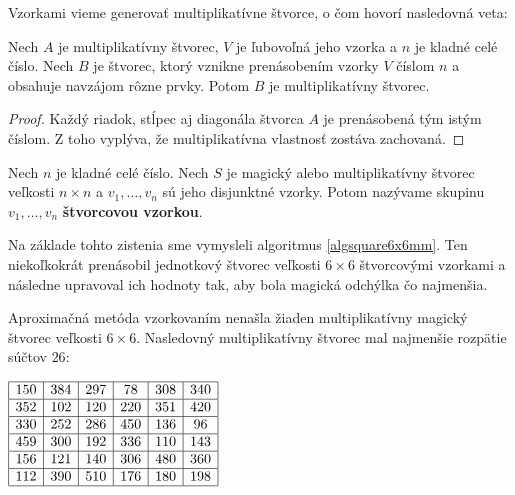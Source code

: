Vzorkami vieme generovať multiplikatívne štvorce, o čom hovorí nasledovná veta:

\begin{theorem}
\label{addmultsquarepattern}
Nech $A$ je multiplikatívny štvorec, $V$ je ľubovoľná jeho vzorka a $n$ je kladné celé číslo. Nech $B$ je štvorec, ktorý vznikne prenásobením vzorky $V$ číslom $n$ a obsahuje navzájom rôzne prvky. Potom $B$ je multiplikatívny štvorec.
\end{theorem}

\begin{proof} Každý riadok, stĺpec aj diagonála štvorca $A$ je prenásobená tým istým číslom. Z toho vyplýva, že multiplikatívna vlastnosť zostáva zachovaná.
\end{proof}

\begin{definition} Nech $n$ je kladné celé číslo. Nech $S$ je magický alebo multiplikatívny štvorec veľkosti $n \times n$ a $v_1, \dots , v_n$ sú jeho disjunktné vzorky. Potom nazývame skupinu $v_1, \dots , v_n$ \textbf{štvorcovou vzorkou}.
\end{definition}

Na základe tohto zistenia sme vymysleli algoritmus \ref{algsquare6x6mm}. Ten niekoľkokrát prenásobil jednotkový štvorec veľkosti $6 \times 6$ štvorcovými vzorkami a následne upravoval ich hodnoty tak, aby bola magická odchýlka čo najmenšia.

\begin{result} Aproximačná metóda vzorkovaním nenašla žiaden multiplikatívny magický štvorec veľkosti $6 \times 6$. Nasledovný multiplikatívny štvorec mal najmenšie rozpätie súčtov $26$:
\end{result}

\begin{center}
$\begin{array}{ |c|c|c|c|c|c| } 
\hline
150 & 384 & 297 & 78 & 308 & 340 \\ 
\hline
352 & 102 & 120 & 220 & 351 & 420 \\ 
\hline
330 & 252 & 286 & 450 & 136 & 96 \\ 
\hline
459 & 300 & 192 & 336 & 110 & 143 \\ 
\hline
156 & 121 & 140 & 306 & 480 & 360 \\ 
\hline
112 & 390 & 510 & 176 & 180 & 198 \\ 
\hline
\end{array}$
\end{center}

